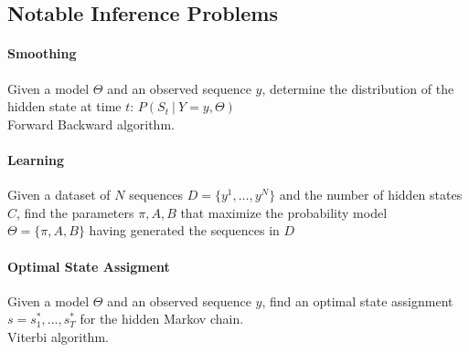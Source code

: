 \documentclass[10pt]{report}
\begin{document}
\subsection{Notable Inference Problems}
\paragraph{Smoothing} Given a model $\Theta$ and an observed sequence $y$, determine the distribution of the hidden state at time $t$: $P(S_t\:|\:Y=y,\Theta)$\\
Forward Backward algorithm.
\paragraph{Learning} Given a dataset of $N$ sequences $D=\{y^1,\ldots,y^N\}$ and the number of hidden states $C$, find the parameters $\pi,A,B$ that maximize the probability model $\Theta = \{\pi,A,B\}$ having generated the sequences in $D$
\paragraph{Optimal State Assigment} Given a model $\Theta$ and an observed sequence $y$, find an optimal state assignment $s = s_1^*,\ldots,s_T^*$ for the hidden Markov chain.\\
Viterbi algorithm.
\end{document}
